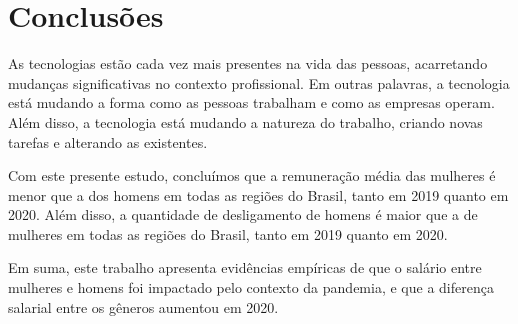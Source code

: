 \section{Conclusões}

As tecnologias estão cada vez mais presentes na vida das pessoas, acarretando mudanças significativas no contexto profissional. Em outras palavras, a tecnologia está mudando a forma como as pessoas trabalham e como as empresas operam. Além disso, a tecnologia está mudando a natureza do trabalho, criando novas tarefas e alterando as existentes.

Com este presente estudo, concluímos que a remuneração média das mulheres é menor que a dos homens em todas as regiões do Brasil, tanto em 2019 quanto em 2020. Além disso, a quantidade de desligamento de homens é maior que a de mulheres em todas as regiões do Brasil, tanto em 2019 quanto em 2020.

Em suma, este trabalho apresenta evidências empíricas de que o salário entre mulheres e homens foi impactado pelo contexto da pandemia, e que a diferença salarial entre os gêneros aumentou em 2020.
